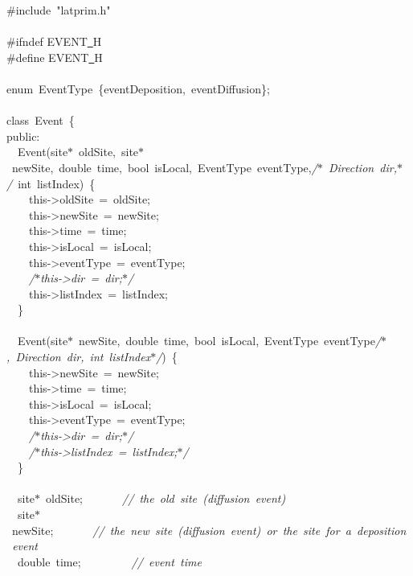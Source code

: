 {\ttfamily \raggedright \small
\#include\ "{}latprim.h"{}\\
\ \\
\#ifndef EVENT\underline\ H\\
\#define EVENT\underline\ H\\
\ \\
enum\ EventType\ \{eventDeposition,\ eventDiffusion\};\\
\ \\
class\ Event\ \{\\
public:\\
\ \ Event(site$\ast$\ oldSite,\ site$\ast$\ newSite,\ double\ time,\ bool\ isLocal,\ EventType\ eventType,\textsl{/$\ast$\ Direction\ dir,$\ast$/}\ int\ listIndex)\ \{\\
\ \ \ \ this-{}>{}oldSite\ =\ oldSite;\\
\ \ \ \ this-{}>{}newSite\ =\ newSite;\\
\ \ \ \ this-{}>{}time\ =\ time;\\
\ \ \ \ this-{}>{}isLocal\ =\ isLocal;\\
\ \ \ \ this-{}>{}eventType\ =\ eventType;\\
\ \ \ \ \textsl{/$\ast$this-{}>{}dir\ =\ dir;$\ast$/}\\
\ \ \ \ this-{}>{}listIndex\ =\ listIndex;\\
\ \ \}\\
\ \\
\ \ Event(site$\ast$\ newSite,\ double\ time,\ bool\ isLocal,\ EventType\ eventType\textsl{/$\ast$,\ Direction\ dir,\ int\ listIndex$\ast$/})\ \{\\
\ \ \ \ this-{}>{}newSite\ =\ newSite;\\
\ \ \ \ this-{}>{}time\ =\ time;\\
\ \ \ \ this-{}>{}isLocal\ =\ isLocal;\\
\ \ \ \ this-{}>{}eventType\ =\ eventType;\\
\ \ \ \ \textsl{/$\ast$this-{}>{}dir\ =\ dir;$\ast$/}\\
\ \ \ \ \textsl{/$\ast$this-{}>{}listIndex\ =\ listIndex;$\ast$/}\\
\ \ \}\\
\ \\
\ \ site$\ast$\ oldSite;\ \ \ \ \ \ \ \textsl{//\ the\ old\ site\ (diffusion\ event)}\\
\ \ site$\ast$\ newSite;\ \ \ \ \ \ \ \textsl{//\ the\ new\ site\ (diffusion\ event)\ or\ the\ site\ for\ a\ deposition\ event}\\
\ \ double\ time;\ \ \ \ \ \ \ \ \ \textsl{//\ event\ time}\\
}
